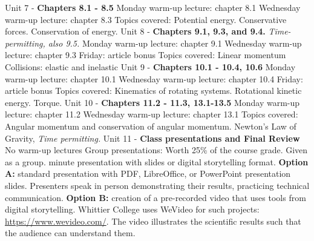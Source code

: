 \documentclass[10pt]{article}
\begin{document}
\begin{outline}[enumerate]
\1 Unit 7 - \textbf{Chapters 8.1 - 8.5}
\2 Monday warm-up lecture: chapter 8.1
\2 Wednesday warm-up lecture: chapter 8.3
\2 Topics covered:
\3 Potential energy.
\3 Conservative forces.
\3 Conservation of energy.
\1 Unit 8 - \textbf{Chapters 9.1, 9.3, and 9.4.} \textit{Time-permitting, also 9.5.}
\2 Monday warm-up lecture: chapter 9.1
\2 Wednesday warm-up lecture: chapter 9.3
\2 Friday: article bonus
\2 Topics covered:
\3 Linear momentum
\3 Collisions: elastic and inelastic
\1 Unit 9 - \textbf{Chapters 10.1 - 10.4, 10.6}
\2 Monday warm-up lecture: chapter 10.1
\2 Wednesday warm-up lecture: chapter 10.4
\2 Friday: article bonus
\2 Topics covered:
\3 Kinematics of rotating systems.
\3 Rotational kinetic energy.
\3 Torque.
\1 Unit 10 - \textbf{Chapters 11.2 - 11.3, 13.1-13.5}
\2 Monday warm-up lecture: chapter 11.2
\2 Wednesday warm-up lecture: chapter 13.1
\2 Topics covered:
\3 Angular momentum and conservation of angular momentum.
\3 Newton's Law of Gravity, \textit{Time permitting.}
\1 Unit 11 - \textbf{Class presentations and Final Review}
\2 No warm-up lectures
\2 Group presentations:
\3 Worth 25\% of the course grade.
\3 Given as a group.
 minute presentation with slides or digital storytelling format.
\3 \textbf{Option A:} standard presentation with PDF, LibreOffice, or PowerPoint presentation slides. Presenters speak in person demonstrating their results, practicing technical communication.
\3 \textbf{Option B:} creation of a pre-recorded video that uses tools from digital storytelling.  Whittier College uses WeVideo for such projects: \url{https://www.wevideo.com/}.  The video illustrates the scientific results such that the audience can understand them.
\end{outline}
\end{document}
